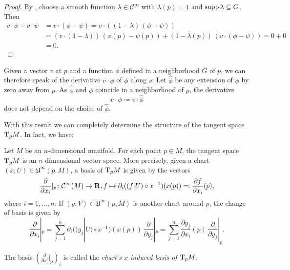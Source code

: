 \begin{proof}
  By , choose a smooth function $\lambda \in
  \mathcal C^\infty$ with $\lambda(p) = 1$ and $\operatorname{supp} \lambda \subseteq G$. Then
  \[
    \begin{split}
      v \cdot \phi - v \cdot \psi
      & = v \cdot (\phi - \psi) = v \cdot \left((1 - \lambda) \, (\phi - \psi)\right) \\
      & = \left(v \cdot (1 - \lambda)\right) \, (\phi(p) - \psi(p))
      + (1 - \lambda(p)) \, \left(v \cdot (\phi - \psi)\right) = 0 + 0 \\
      & = 0.
    \end{split}
  \]
\end{proof}

Given a vector $v$ at $p$ and a function $\phi$ defined in a neighborhood $G$
of $p$, we can therefore speak of the derivative $v \cdot \phi$ of $\phi$ along
$v$: Let $\widehat\phi$ be any extension of $\phi$ by zero away from $p$. As
$\widehat\phi$ and $\phi$ coincide in a neighborhood of $p$, the derivative
\[
  v \cdot \phi \coloneqq v \cdot \widehat\phi
\]
does not depend on the choice of $\widehat\phi$.

With this result we can completely determine the structure of the tangent space
$\mathrm T_p M$. In fact, we have:

\begin{thm}
  \label{thm:coordinate_basis}
  Let $M$ be an $n$-dimensional manifold. For each point $p \in M$, the tangent
  space $\mathrm T_p M$ is an $n$-dimensional vector space. More precisely, given
  a chart $(x, U) \in \mathfrak U^\infty(p, M)$, a basis of $\mathrm T_p M$ is given
  by the vectors
  \begin{equation}
    \label{eq:coordinate_basis}
    \frac{\partial}{\partial x_i}|_p\colon \mathcal C^\infty(M)
    \to \mathbf{R}, f \mapsto \partial_i ((f|U) \circ x^{-1}) (x(p))
    \eqqcolon \frac{\partial f}{\partial x_i}(p),  
  \end{equation}
  where $i = 1, \dotsc, n$. If $(y, V) \in \mathfrak U^\infty(p, M)$ is another
  chart around $p$, the change of basis is given by
  \begin{equation}
    \label{eq:basis_change}
    \frac{\partial}{\partial x_i}|_p =
    \sum_{j = 1}^n \partial_i ((y_j|U) \circ x^{-1}) (x(p))
    \, \frac{\partial}{\partial y_j}|_p
    =
    \sum_{j = 1}^n \frac{\partial y_j}{\partial x_i}(p) \, 
    \frac{\partial}{\partial y_j}|_p.
  \end{equation}
\end{thm}
The basis $(\frac{\partial}{\partial x_i}|_p)_i$ is called the
\emph{chart's $x$ induced basis of $\mathrm T_p M$}.

